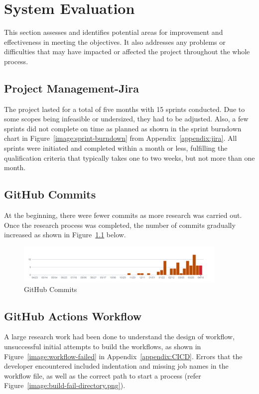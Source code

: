 \chapter{System Evaluation}

This section assesses and identifies potential areas for improvement and effectiveness in meeting the objectives. It also addresses any problems or difficulties that may have impacted or affected the project throughout the whole process.

\section{Project Management-Jira}
The project lasted for a total of five months with 15 sprints conducted. Due to some scopes being infeasible or undersized, they had to be adjusted. Also, a few sprints did not complete on time as planned as shown in the sprint burndown chart in Figure~\ref{image:sprint-burndown} from Appendix~\ref{appendix:jira}. All sprints were initiated and completed within a month or less, fulfilling the qualification criteria that typically takes one to two weeks, but not more than one month.

\section{GitHub Commits}
At the beginning, there were fewer commits as more research was carried out. Once the research process was completed, the number of commits gradually increased as shown in Figure~\ref{image:commits} below.

\begin{figure}[h!]
    \centering
    \includegraphics[width=0.9\textwidth]{images/commits.png}
    \caption{GitHub Commits}
    \label{image:commits}
\end{figure}

\section{GitHub Actions Workflow}
A large research work had been done to understand the design of workflow, unsuccessful initial attempts to build the workflows, as shown in Figure~\ref{image:workflow-failed} in Appendix~\ref{appendix:CICD}. Errors that the developer encountered included indentation and missing job names in the workflow file, as well as the correct path to start a process (refer Figure~\ref{image:build-fail-directory.png}). 

